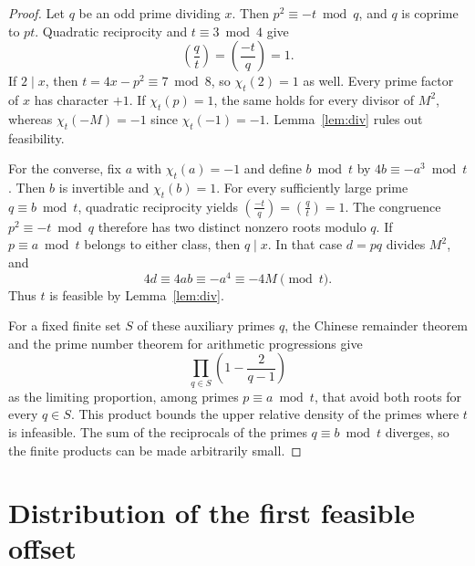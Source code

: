 \documentclass[11pt,a4paper]{article}
\theoremstyle{definition}
\newcommand{\jac}[2]{\left(\frac{#1}{#2}\right)}
\begin{document}
\begin{proof}
Let \(q\) be an odd prime dividing \(x\). Then
\(p^2\equiv-t\bmod q\), and \(q\) is coprime to \(pt\).
Quadratic reciprocity and \(t\equiv3\bmod4\) give
\[
  \jac{q}{t}=\jac{-t}{q}=1.
\]
If \(2\mid x\), then \(t=4x-p^2\equiv7\bmod8\), so
\(\chi_t(2)=1\) as well. Every prime factor of \(x\) has character
\(+1\). If \(\chi_t(p)=1\), the same holds for every divisor of
\(M^2\), whereas \(\chi_t(-M)=-1\) since \(\chi_t(-1)=-1\).
Lemma~\ref{lem:div} rules out feasibility.

For the converse, fix \(a\) with \(\chi_t(a)=-1\) and define
\(b\bmod t\) by \(4b\equiv-a^3\bmod t\). Then \(b\) is invertible
and \(\chi_t(b)=1\). For every sufficiently large prime
\(q\equiv b\bmod t\), quadratic reciprocity yields
\(\jac{-t}{q}=\jac{q}{t}=1\). The congruence \(p^2\equiv-t\bmod q\)
therefore has two distinct nonzero roots modulo \(q\).
If \(p\equiv a\bmod t\) belongs to either class, then \(q\mid x\).
In that case \(d=pq\) divides \(M^2\), and
\[
  4d\equiv4ab\equiv-a^4\equiv-4M\pmod t .
\]
Thus \(t\) is feasible by Lemma~\ref{lem:div}.

For a fixed finite set \(S\) of these auxiliary primes \(q\), the
Chinese remainder theorem and the prime number theorem for arithmetic
progressions give
\[
  \prod_{q\in S}\left(1-\frac{2}{q-1}\right)
\]
as the limiting proportion, among primes \(p\equiv a\bmod t\), that
avoid both roots for every \(q\in S\). This product bounds the upper
relative density of the primes where \(t\) is infeasible. The sum of
the reciprocals of the primes \(q\equiv b\bmod t\) diverges, so the
finite products can be made arbitrarily small.
\end{proof}

\section{Distribution of the first feasible offset}
\end{document}
